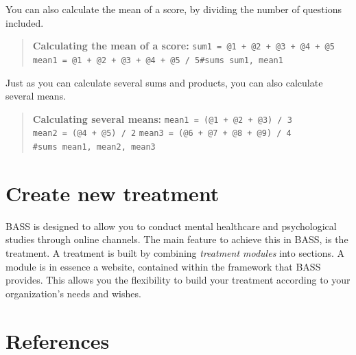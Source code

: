 \documentclass[]{book}
\begin{document}
You can also calculate the mean of a score, by dividing the number of questions included.

\begin{quote}
\textbf{Calculating the mean of a score:} \texttt{sum1\ =\ @1\ +\ @2\ +\ @3\ +\ @4\ +\ @5} \texttt{mean1\ =\ @1\ +\ @2\ +\ @3\ +\ @4\ +\ @5\ /\ 5}\texttt{\#sums\ sum1,\ mean1}
\end{quote}

Just as you can calculate several sums and products, you can also calculate several means.

\begin{quote}
\textbf{Calculating several means:} \texttt{mean1\ =\ (@1\ +\ @2\ +\ @3)\ /\ 3} \texttt{mean2\ =\ (@4\ +\ @5)\ /\ 2} \texttt{mean3\ =\ (@6\ +\ @7\ +\ @8\ +\ @9)\ /\ 4} \texttt{\#sums\ mean1,\ mean2,\ mean3}
\end{quote}

\hypertarget{create-new-treatment}{%
\chapter{Create new treatment}\label{create-new-treatment}}

BASS is designed to allow you to conduct mental healthcare and psychological studies through online channels. The main feature to achieve this in BASS, is the treatment.
A treatment is built by combining \emph{treatment modules} into sections. A module is in essence a website, contained within the framework that BASS provides. This allows you the flexibility to build your treatment according to your organization's needs and wishes.

\hypertarget{references}{%
\chapter{References}\label{references}}


\end{document}
